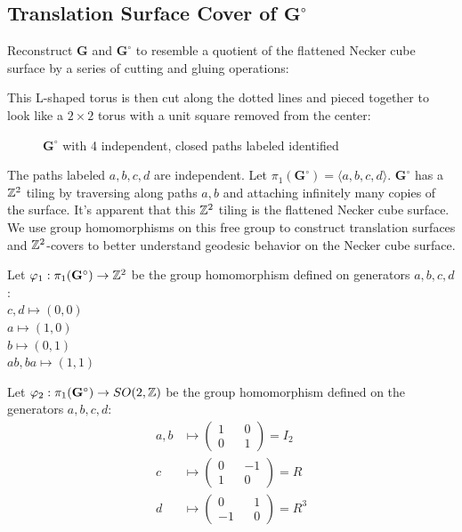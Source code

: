 \documentclass[]{article}
\def\bG{\mathbf{G}} \def\bGs{\mathbf{G}^\circ}
\def\<{\langle} \def\>{\rangle}
\begin{document}
\subsection{Translation Surface Cover of $\bGs$}
Reconstruct $\bG$ and $\bGs$ to resemble a quotient of the flattened Necker cube surface by a series of cutting and gluing operations: \\
\begin{figure}[H]
\centering

\end{figure}
\noindent This L-shaped torus is then cut along the dotted lines and pieced together to look like a $2\times2$ torus with a unit square removed from the center:\\
\begin{figure}[H]
\centering

\caption{$\bGs$ with 4 independent, closed paths labeled identified}
\end{figure}
The paths labeled $a,b,c,d$ are independent. Let $\pi_1(\bGs)=\<a,b,c,d\>$. $\bGs$ has a $\mathbb{Z}^2$ tiling by traversing along paths $a,b$ and attaching infinitely many copies of the surface. It's apparent that this $\mathbb{Z}^2$ tiling is the flattened Necker cube surface. We use group homomorphisms on this free group to construct translation surfaces and $\mathbb{Z}^2$-covers to better understand geodesic behavior on the Necker cube surface.

\begin{Def}
Let $\varphi_1:\pi_1(\bGs)\rightarrow \ZZ^2$ be the group homomorphism defined on generators $a,b,c,d$: \\$c,d\mapsto(0,0)$\\ $a\mapsto(1,0)$\\$b\mapsto(0,1)$\\ $ab,ba\mapsto(1,1)$
\end{Def}

\begin{Def}
Let $\varphi_2:\pi_1(\bGs)\rightarrow SO(2,\ZZ)$ be the group homomorphism defined on the generators $a,b,c,d$:
\begin{align*}
a,b & \mapsto \begin{pmatrix}
1 && 0 \\ 0 && 1\end{pmatrix}=I_2\\
c & \mapsto\begin{pmatrix}0 && -1\\1 && 0\end{pmatrix}=R\\ d & \mapsto\begin{pmatrix}0 && 1\\-1 && 0\end{pmatrix}=R^3
\end{align*}
\end{Def}
\end{document}
